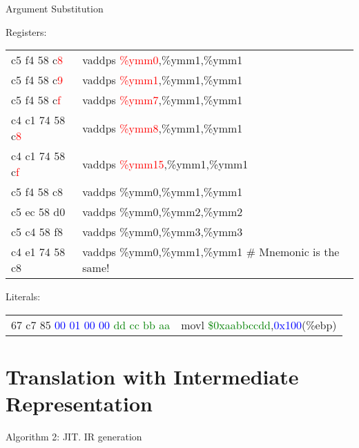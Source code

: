 \begin{frame}{Argument Substitution}

{\ttfamily\small
{\sffamily Registers:}

\begin{tabular}{ll}  
c5 f4 58 c\textcolor{red}{8}  &    vaddps \textcolor{red}{\%ymm0},\%ymm1,\%ymm1 \\
c5 f4 58 c\textcolor{red}{9}  &    vaddps \textcolor{red}{\%ymm1},\%ymm1,\%ymm1 \\
c5 f4 58 c\textcolor{red}{f}  &    vaddps \textcolor{red}{\%ymm7},\%ymm1,\%ymm1 \\\pause
c4 c1 74 58 c\textcolor{red}{8} &  vaddps \textcolor{red}{\%ymm8},\%ymm1,\%ymm1 \\
c4 c1 74 58 c\textcolor{red}{f} &  vaddps \textcolor{red}{\%ymm15},\%ymm1,\%ymm1 \\
c5 f4 58 c8  &    vaddps \%ymm0,\%ymm1,\%ymm1 \\
c5 ec 58 d0  &    vaddps \%ymm0,\%ymm2,\%ymm2 \\
c5 c4 58 f8  &    vaddps \%ymm0,\%ymm3,\%ymm3 \\\pause
c4 e1 74 58 c8 &  vaddps \%ymm0,\%ymm1,\%ymm1 \# Mnemonic is the same!\\
\end{tabular}
\pause
{\sffamily Literals:}
\begin{tabular}{ll}
67 c7 85 \textcolor{blue}{00 01 00 00} \textcolor{green}{dd cc bb aa}   & movl \textcolor{green}{\$0xaabbccdd},\textcolor{blue}{0x100}(\%ebp)
\end{tabular}
}

\end{frame}

\section{Translation with Intermediate Representation}

\begin{frame}{Algorithm 2: JIT. IR generation}
\centering
{}
\end{frame}

